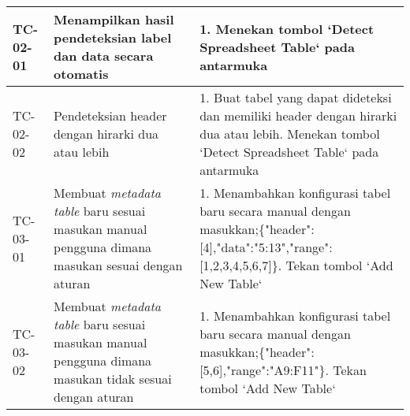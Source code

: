 \begin{small}
\begin{longtable}{ | p{2cm} | p{4cm} | p{7cm} | }
	TC-02-01 & Menampilkan hasil pendeteksian label dan data secara otomatis & 1. Menekan tombol `Detect Spreadsheet Table` pada antarmuka\\ \hline
	TC-02-02 & Pendeteksian header dengan hirarki dua atau lebih & 1. Buat tabel yang dapat dideteksi dan memiliki header dengan hirarki dua atau lebih\newline 2. Menekan tombol `Detect Spreadsheet Table` pada antarmuka\\ \hline 

	TC-03-01 & Membuat \textit{metadata table} baru sesuai masukan manual pengguna dimana masukan sesuai dengan aturan & 1. Menambahkan konfigurasi tabel baru secara manual dengan masukkan;\newline \{\newline  "header":[4],\newline  "data":"5:13",\newline  "range":[1,2,3,4,5,6,7]\newline \}\newline 2. Tekan tombol `Add New Table`\\ \hline 
	TC-03-02 & Membuat \textit{metadata table} baru sesuai masukan manual pengguna dimana masukan tidak sesuai dengan aturan & 1. Menambahkan konfigurasi tabel baru secara manual dengan masukkan;\newline \{\newline  "header":[5,6],\newline  "range":"A9:F11"\newline \}\newline 2. Tekan tombol `Add New Table`\\ \hline 


\end{longtable}
\end{small}
